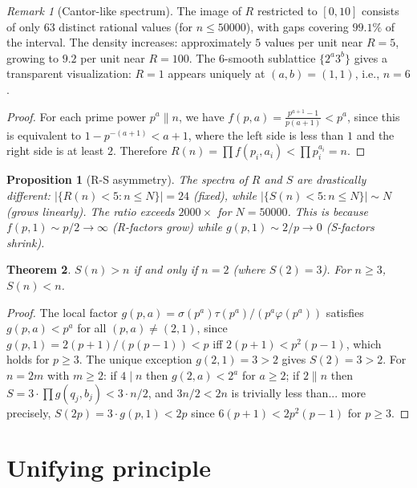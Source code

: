 \documentclass[11pt]{amsart}
\newtheorem{theorem}{Theorem}
\newtheorem{proposition}[theorem]{Proposition}
\theoremstyle{remark}
\newtheorem*{remark}{Remark}
\begin{document}
\begin{remark}[Cantor-like spectrum]
The image of $R$ restricted to $[0,10]$ consists of only $63$
distinct rational values (for $n \leq 50000$),
with gaps covering $99.1\%$ of the interval.
The density increases: approximately $5$ values per unit near $R=5$,
growing to $9.2$ per unit near $R=100$.
The $6$-smooth sublattice $\{2^a 3^b\}$ gives a transparent
visualization: $R=1$ appears uniquely at $(a,b)=(1,1)$, i.e., $n=6$.
\end{remark}

\begin{proof}
For each prime power $p^a \| n$, we have
$f(p,a) = \frac{p^{a+1}-1}{p(a+1)} < p^a$,
since this is equivalent to $1 - p^{-(a+1)} < a+1$,
where the left side is less than $1$ and the right side is at least $2$.
Therefore $R(n) = \prod f(p_i, a_i) < \prod p_i^{a_i} = n$.
\end{proof}

\begin{proposition}[R-S asymmetry]\label{prop:asymmetry}
The spectra of $R$ and $S$ are drastically different:
$|\{R(n) < 5 : n \leq N\}| = 24$ (fixed), while
$|\{S(n) < 5 : n \leq N\}| \sim N$ (grows linearly).
The ratio exceeds $2000\times$ for $N = 50000$.
This is because $f(p,1) \sim p/2 \to \infty$ (R-factors grow)
while $g(p,1) \sim 2/p \to 0$ (S-factors shrink).
\end{proposition}

\begin{theorem}\label{thm:S}
$S(n) > n$ if and only if $n = 2$ (where $S(2)=3$).
For $n \geq 3$, $S(n) < n$.
\end{theorem}

\begin{proof}
The local factor $g(p,a) = \sigma(p^a)\tau(p^a)/(p^a\varphi(p^a))$
satisfies $g(p,a) < p^a$ for all $(p,a) \neq (2,1)$,
since $g(p,1) = 2(p+1)/(p(p-1)) < p$ iff $2(p+1) < p^2(p-1)$,
which holds for $p \geq 3$.
The unique exception $g(2,1) = 3 > 2$ gives $S(2) = 3 > 2$.
For $n = 2m$ with $m \geq 2$: if $4 \mid n$ then $g(2,a) < 2^a$ for $a \geq 2$;
if $2 \| n$ then $S = 3 \cdot \prod g(q_j,b_j) < 3 \cdot n/2$,
and $3n/2 < 2n$ is trivially less than... more precisely,
$S(2p) = 3 \cdot g(p,1) < 2p$ since $6(p+1) < 2p^2(p-1)$ for $p \geq 3$.
\end{proof}

\section{Unifying principle}
\end{document}
